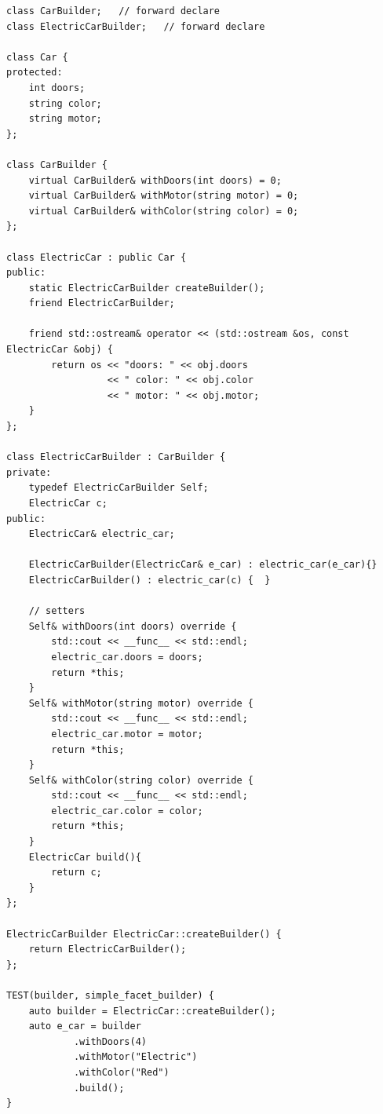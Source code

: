 \documentclass[11pt]{article}
\begin{document}
\begin{itemize}
        \begin{multicols}{2}
            \begin{lstlisting}
class CarBuilder;   // forward declare
class ElectricCarBuilder;   // forward declare

class Car {
protected:
    int doors;
    string color;
    string motor;
};

class CarBuilder {
    virtual CarBuilder& withDoors(int doors) = 0;
    virtual CarBuilder& withMotor(string motor) = 0;
    virtual CarBuilder& withColor(string color) = 0;
};

class ElectricCar : public Car {
public:
    static ElectricCarBuilder createBuilder();
    friend ElectricCarBuilder;

    friend std::ostream& operator << (std::ostream &os, const ElectricCar &obj) {
        return os << "doors: " << obj.doors
                  << " color: " << obj.color
                  << " motor: " << obj.motor;
    }
};

class ElectricCarBuilder : CarBuilder {
private:
    typedef ElectricCarBuilder Self;
    ElectricCar c;
public:
    ElectricCar& electric_car;

    ElectricCarBuilder(ElectricCar& e_car) : electric_car(e_car){}
    ElectricCarBuilder() : electric_car(c) {  }

    // setters
    Self& withDoors(int doors) override {
        std::cout << __func__ << std::endl;
        electric_car.doors = doors;
        return *this;
    }
    Self& withMotor(string motor) override {
        std::cout << __func__ << std::endl;
        electric_car.motor = motor;
        return *this;
    }
    Self& withColor(string color) override {
        std::cout << __func__ << std::endl;
        electric_car.color = color;
        return *this;
    }
    ElectricCar build(){
        return c;
    }
};

ElectricCarBuilder ElectricCar::createBuilder() {
    return ElectricCarBuilder();
};

TEST(builder, simple_facet_builder) {
    auto builder = ElectricCar::createBuilder();
    auto e_car = builder
            .withDoors(4)
            .withMotor("Electric")
            .withColor("Red")
            .build();
}
            \end{lstlisting}
        \end{multicols}
    \end{itemize}
\end{document}
